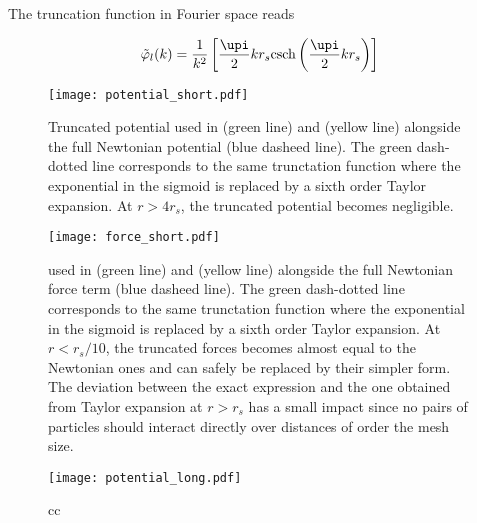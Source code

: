 The truncation function in Fourier space reads

\begin{equation}
  \tilde\varphi_l(k) =
  \frac{1}{k^2}\left[\frac{\upi}{2}kr_s\textrm{csch}\left(\frac{\upi}{2}kr_s\right)
    \right]
\end{equation}

\begin{figure}
\texttt{[image: potential\_short.pdf]}
\caption{Truncated potential used in \swift (green line) and \gadget
  (yellow line) alongside the full Newtonian potential (blue dasheed
  line). The green dash-dotted line corresponds to the same
  trunctation function where the exponential in the sigmoid is
  replaced by a sixth order Taylor expansion. At $r>4r_s$, the
  truncated potential becomes negligible.}
\label{fig:fmm:potential_short}
\end{figure}



\begin{figure}
\texttt{[image: force\_short.pdf]}
\caption{used in \swift (green line) and \gadget
  (yellow line) alongside the full Newtonian force term (blue dasheed
  line). The green dash-dotted line corresponds to the same
  trunctation function where the exponential in the sigmoid is
  replaced by a sixth order Taylor expansion. At $r<r_s/10$, the
  truncated forces becomes almost equal to the Newtonian ones and can
  safely be replaced by their simpler form. The deviation between the
  exact expression and the one obtained from Taylor expansion at
  $r>r_s$ has a small impact since no pairs of particles should
  interact directly over distances of order the mesh size. }
\label{fig:fmm:force_short}
\end{figure}


\begin{figure}
\texttt{[image: potential\_long.pdf]}
\caption{cc}
\label{fig:fmm:potential_long}
\end{figure}
